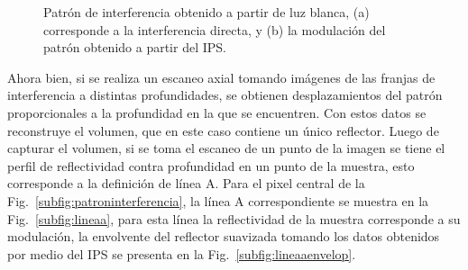 \begin{figure}[ht!]
	\centering
	\caption[Patrón de interferencia con luz blanca]{Patrón de interferencia obtenido a partir de luz blanca, (a) corresponde a la interferencia directa, y (b) la modulación del patrón obtenido a partir del IPS.}
	\label{fig:modulacionfranjasluzblanca}
\end{figure}

Ahora bien, si se realiza un escaneo axial tomando imágenes de las franjas de interferencia a distintas profundidades, se obtienen desplazamientos del patrón proporcionales a la profundidad en la que se encuentren. Con estos datos se reconstruye el volumen, que en este caso contiene un único reflector. Luego de capturar el volumen, si se toma el escaneo de un punto de la imagen \enface se tiene el perfil de reflectividad contra profundidad en un punto de la muestra, esto corresponde a la definición de línea A. Para el pixel central de la Fig.~\ref{subfig:patroninterferencia}, la línea A correspondiente se muestra en la Fig.~\ref{subfig:lineaa}, para esta línea la reflectividad de la muestra corresponde a su modulación, la envolvente del reflector suavizada tomando los datos obtenidos por medio del IPS se presenta en la Fig.~\ref{subfig:lineaaenvelop}. 



